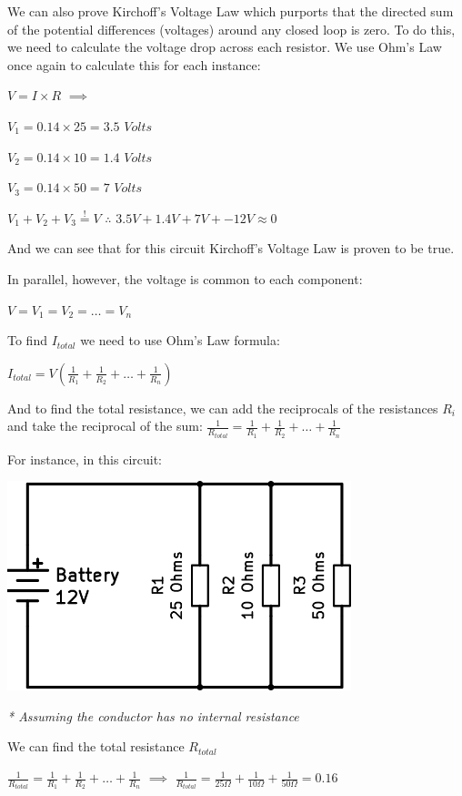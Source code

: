 \documentclass[11pt,a4paper]{article}
\begin{document}
We can also prove Kirchoff's Voltage Law which purports that the directed sum of the potential differences (voltages) around any closed loop is zero. To do this, we need to calculate the voltage drop across each resistor. We use Ohm's Law once again to calculate this for each instance:

$V = I \times R$ $\implies$

$V_1 = 0.14 \times 25 = 3.5$ $Volts$

$V_2 = 0.14 \times 10 = 1.4$ $Volts$

$V_3 = 0.14 \times 50 = 7$ $Volts$

$V_1 + V_2 + V_3 \overset{!}{=} V$ $\therefore$ $3.5V + 1.4V + 7V + -12V \approx 0$

And we can see that for this circuit Kirchoff's Voltage Law is proven to be true.

In parallel, however, the voltage is common to each component:

$V = V_1 = V_2 = \ldots = V_n$

To find $I_{total}$ we need to use Ohm's Law formula:

$I_{total} = V(\frac{1}{R_1} + \frac{1}{R_2} + \ldots + \frac{1}{R_n})$

And to find the total resistance, we can add the reciprocals of the resistances $R_i$ and take the reciprocal of the sum:
$\frac{1}{R_{total}} = \frac{1}{R_1} + \frac{1}{R_2} + \ldots + \frac{1}{R_n}$

For instance, in this circuit:

\begin{center}
\includegraphics[width=10cm]{Resistor2.png}\par
\textit{* Assuming the conductor has no internal resistance}
\end{center}


We can find the total resistance $R_{total}$

$\frac{1}{R_{total}} = \frac{1}{R_1} + \frac{1}{R_2} + \ldots + \frac{1}{R_n}$ $\implies$ $\frac{1}{R_{total}} = \frac{1}{25 \Omega} + \frac{1}{10 \Omega} + \frac{1}{50 \Omega} = 0.16$
\end{document}
